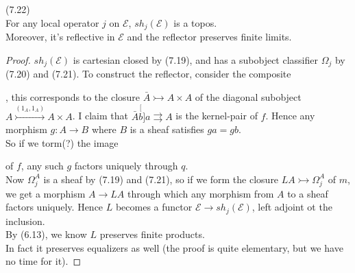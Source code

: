 \documentclass[a4paper]{article}
\begin{document}
\begin{thm} (7.22)\\
    For any local operator $j$ on $\mathcal{E}$, $sh_j(\mathcal{E})$ is a topos.\\
    Moreover, it's reflective in $\mathcal{E}$ and the reflector preserves finite limits.
    \begin{proof}
        $sh_j(\mathcal{E})$ is cartesian closed by (7.19), and has a subobject classifier $\Omega_j$ by (7.20) and (7.21). To construct the reflector, consider the composite
        , this corresponds to the closure $\bar{A} \rightarrowtail A \times A$ of the diagonal subobject $A \stackrel{(1_A,1_A)}{\rightarrowtail} A \times A$. I claim that $\bar{A} \stackrel[b]{a}{\rightrightarrows} A$ is the kernel-pair of $f$. Hence any morphism $g:A \to B$ where $B$ is a sheaf satisfies $ga = gb$.\\
        So if we torm(?) the image 
        of $f$, any such $g$ factors uniquely through $q$.\\
        Now $\Omega_j^A$ is a sheaf by (7.19) and (7.21), so if we form the closure $LA \rightarrowtail \Omega_j^A$ of $m$, we get a morphism $A \to LA$ through which any morphism from $A$ to a sheaf factors uniquely. Hence $L$ becomes a functor $\mathcal{E} \to sh_j(\mathcal{E})$, left adjoint ot the inclusion.\\
        By (6.13), we know $L$ preserves finite products.\\
        In fact it preserves equalizers as well (the proof is quite elementary, but we have no time for it).
    \end{proof}
\end{thm}
\end{document}
